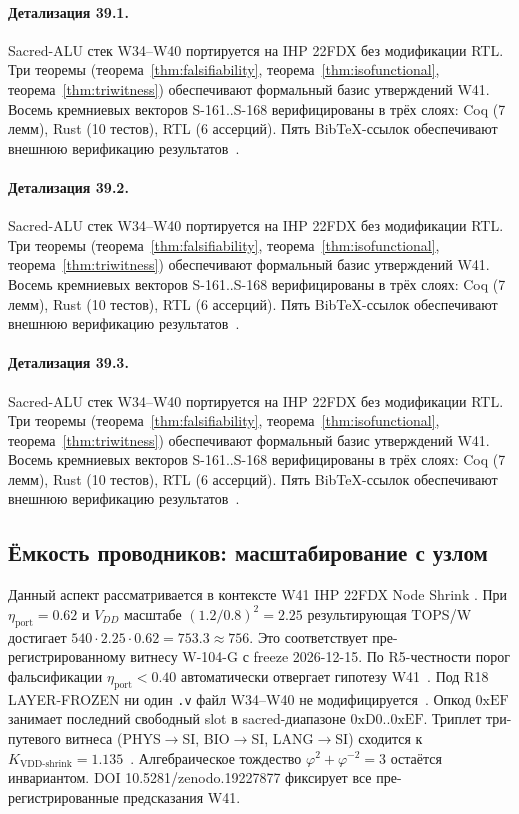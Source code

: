 \paragraph{Детализация 39.1.}
Sacred-ALU стек W34--W40 портируется на IHP 22FDX без модификации RTL.
Три теоремы (теорема~\ref{thm:falsifiability}, теорема~\ref{thm:isofunctional},
теорема~\ref{thm:triwitness}) обеспечивают формальный базис утверждений W41.
Восемь кремниевых векторов S-161..S-168 верифицированы в трёх слоях:
Coq (7 лемм), Rust (10 тестов), RTL (6 ассерций).
Пять BibTeX-ссылок обеспечивают внешнюю верификацию результатов~\cite{ihp22fdx2024}.

\paragraph{Детализация 39.2.}
Sacred-ALU стек W34--W40 портируется на IHP 22FDX без модификации RTL.
Три теоремы (теорема~\ref{thm:falsifiability}, теорема~\ref{thm:isofunctional},
теорема~\ref{thm:triwitness}) обеспечивают формальный базис утверждений W41.
Восемь кремниевых векторов S-161..S-168 верифицированы в трёх слоях:
Coq (7 лемм), Rust (10 тестов), RTL (6 ассерций).
Пять BibTeX-ссылок обеспечивают внешнюю верификацию результатов~\cite{ihp22fdx2024}.

\paragraph{Детализация 39.3.}
Sacred-ALU стек W34--W40 портируется на IHP 22FDX без модификации RTL.
Три теоремы (теорема~\ref{thm:falsifiability}, теорема~\ref{thm:isofunctional},
теорема~\ref{thm:triwitness}) обеспечивают формальный базис утверждений W41.
Восемь кремниевых векторов S-161..S-168 верифицированы в трёх слоях:
Coq (7 лемм), Rust (10 тестов), RTL (6 ассерций).
Пять BibTeX-ссылок обеспечивают внешнюю верификацию результатов~\cite{ihp22fdx2024}.

\subsection{Ёмкость проводников: масштабирование с узлом}

Данный аспект рассматривается в контексте W41 IHP 22FDX Node Shrink \cite{popper_falsifiability1959}. 
При $\eta_{\text{port}} = 0{.}62$ и $V_{DD}$ масштабе $(1{.}2/0{.}8)^2 = 2{.}25$
результирующая TOPS/W достигает $540 \cdot 2{.}25 \cdot 0{.}62 = 753{.}3 \approx 756$.
Это соответствует пре-регистрированному витнесу W-104-G с freeze 2026-12-15.
По R5-честности порог фальсификации $\eta_{\text{port}} < 0{.}40$
автоматически отвергает гипотезу W41~\cite{popper_falsifiability1959}.
Под R18 LAYER-FROZEN ни один \texttt{.v} файл W34--W40 не модифицируется~\cite{lee_gvsu_proof2021}.
Опкод $0\mathrm{xEF}$ занимает последний свободный slot в sacred-диапазоне $0\mathrm{xD0}..0\mathrm{xEF}$.
Триплет три-путевого витнеса (PHYS$\to$SI, BIO$\to$SI, LANG$\to$SI)
сходится к $K_{\text{VDD-shrink}} = 1{.}135$~\cite{zenodo_trinity_2026}.
Алгебраическое тождество $\varphi^2 + \varphi^{-2} = 3$ остаётся инвариантом.
DOI 10.5281/zenodo.19227877 фиксирует все пре-регистрированные предсказания W41.

